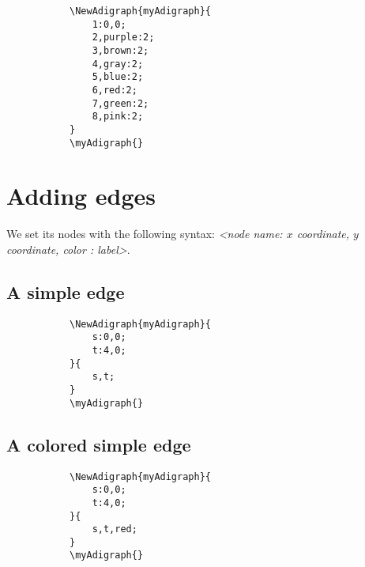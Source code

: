 \documentclass{report}
\begin{document}
\begin{figure}
	\begin{subfigure}{0.49\textwidth}
		\begin{verbatim}
\NewAdigraph{myAdigraph}{
	1:0,0;
	2,purple:2;
	3,brown:2;
	4,gray:2;
	5,blue:2;
	6,red:2;
	7,green:2;
	8,pink:2;
}
\myAdigraph{}
\end{verbatim}
	\end{subfigure}
	\begin{subfigure}{0.49\textwidth}
		\myAdigraph{}
	\end{subfigure}
\end{figure}


\section{Adding edges}
We set its nodes with the following syntax: \textit{<node name: \(x\) coordinate, \(y\) coordinate, color : label>}.

\subsection{A simple edge}
\begin{figure}
	\begin{subfigure}{0.49\textwidth}
		\begin{verbatim}
\NewAdigraph{myAdigraph}{
 	s:0,0;
 	t:4,0;
}{
	s,t;
}
\myAdigraph{}
\end{verbatim}
	\end{subfigure}
	\begin{subfigure}{0.49\textwidth}
		\myAdigraph{}
	\end{subfigure}
\end{figure}

\subsection{A colored simple edge}
\begin{figure}
	\begin{subfigure}{0.49\textwidth}
		\begin{verbatim}
\NewAdigraph{myAdigraph}{
 	s:0,0;
 	t:4,0;
}{
	s,t,red;
}
\myAdigraph{}
\end{verbatim}
	\end{subfigure}
	\begin{subfigure}{0.49\textwidth}
		\myAdigraph{}
	\end{subfigure}
\end{figure}
\end{document}
